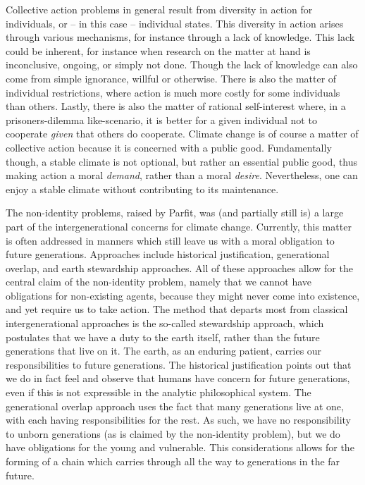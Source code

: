 \documentclass[12pt]{report}
\begin{document}
Collective action problems in general result from diversity in action for
individuals, or -- in this case -- individual states. This diversity in action
arises through various mechanisms, for instance through a lack of knowledge.
This lack could be inherent, for instance when research on the matter at hand is
inconclusive, ongoing, or simply not done. Though the lack of knowledge can also
come from simple ignorance, willful or otherwise. There is also the matter of
individual restrictions, where action is much more costly for some individuals
than others. Lastly, there is also the matter of rational self-interest where,
in a prisoners-dilemma like-scenario, it is better for a given individual not to
cooperate \emph{given} that others do cooperate.  Climate change is of course a
matter of collective action because it is concerned with a public good.
Fundamentally though, a stable climate is not optional, but rather an essential
public good, thus making action a moral \emph{demand}, rather than a moral
\emph{desire}. Nevertheless, one can enjoy a stable climate without contributing
to its maintenance.

The non-identity problems, raised by Parfit, was (and partially still is) a
large part of the intergenerational concerns for climate change. Currently, this
matter is often addressed in manners which still leave us with a moral
obligation to future generations. Approaches include historical justification,
generational overlap, and earth stewardship approaches. All of these approaches
allow for the central claim of the non-identity problem, namely that we cannot
have obligations for non-existing agents, because they might never come into
existence, and yet require us to take action. The method that departs most from
classical intergenerational approaches is the so-called stewardship approach,
which postulates that we have a duty to the earth itself, rather than the future
generations that live on it. The earth, as an enduring patient, carries our
responsibilities to future generations. The historical justification points out
that we do in fact feel and observe that humans have concern for future
generations, even if this is not expressible in the analytic philosophical
system. The generational overlap approach uses the fact that many generations
live at one, with each having responsibilities for the rest. As such, we have no
responsibility to unborn generations (as is claimed by the non-identity
problem), but we do have obligations for the young and vulnerable. This
considerations allows for the forming of a chain which carries through all the
way to generations in the far future.
\end{document}
